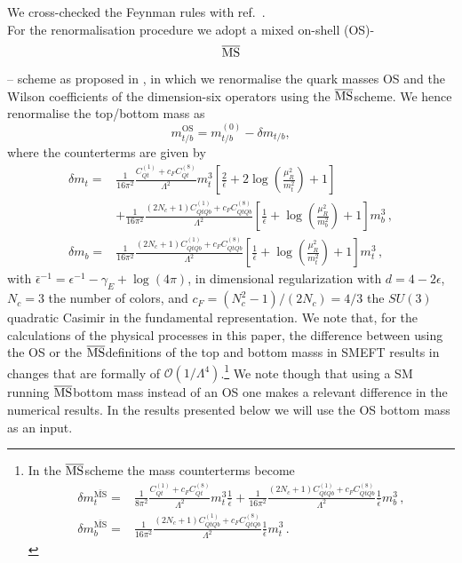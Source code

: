 We cross-checked the Feynman rules with ref.~\cite{Dedes:2017zog}.
\\
For the renormalisation procedure we adopt a mixed on-shell (OS)-$$\overline{\mathrm{MS}}$$ -- scheme as proposed in \cite{Dawson:2018pyl}, in which we renormalise 
the quark masses OS and the Wilson coefficients of the dimension-six operators using  the $\overline{\mathrm{MS}}$\;scheme. 
We hence renormalise the top/bottom mass as
\begin{equation}
	m_{t/b}^{\text{OS}}=m_{t/b}^{(0)}-\delta m_{t/b},
\end{equation}
%
where the counterterms are given by
\begin{align}
	\delta m_t =&\frac{1}{16 \pi^2} \frac{C_{Qt}^{(1)}+c_F C_{Qt}^{(8)}}{\Lambda^2}m_t^3\left[ \frac{2}{\bar{\epsilon}} +2 \log\left(\frac{\mu_R^2}{m_t^2}\right)+1\right] \\ &+ \frac{1}{16 \pi^2}  \frac{(2 N_c+1) C_{QtQb}^{(1)}+c_F C_{QtQb}^{(8)}}{\Lambda^2}  \left[ \frac{1}{\bar{\epsilon}} +  \log\left(\frac{\mu_R^2}{m_b^2}\right)+1 \right]  m_b^3\,, \nonumber \\
	\delta m_b=&\frac{1}{16 \pi^2} \frac{(2 N_c+1)C_{QtQb}^{(1)}+c_F C_{QtQb}^{(8)}}{\Lambda^2}\left[ \frac{1}{\bar{\epsilon}} +\log\left( \frac{\mu_R^2}{m_t^2}\right)+1\right] m_t^3\,,
\end{align}
with $\bar{\epsilon}^{-1} = \epsilon^{-1}- \gamma_E +\log(4 \pi)$, in dimensional regularization with $d=4-2\epsilon$, $N_c=3$ the number of colors, and $c_F=(N_c^2-1)/(2N_c)=4/3$ the $SU(3)$ quadratic Casimir in the fundamental representation. 
We note that, for the calculations of the physical processes in this paper, the difference between using the OS or the $\overline{\mathrm{MS}}$\;definitions of the top and bottom masss in SMEFT results in changes that are formally of $\mathcal{O}(1/\Lambda^4)$.\footnote{In the $\overline{\mathrm{MS}}$\;scheme the mass counterterms become
	\begin{align}
		\delta m_t^{\bar{\text{MS}}} =&\frac{1}{8 \pi^2} \frac{C_{Qt}^{(1)}+c_F C_{Qt}^{(8)}}{\Lambda^2}m_t^3\frac{1}{\bar{\epsilon}}+ \frac{1}{16 \pi^2}  \frac{(2 N_c+1) C_{QtQb}^{(1)}+c_F C_{QtQb}^{(8)}}{\Lambda^2}   \frac{1}{\bar{\epsilon}}  m_b^3\,,  \\
		\delta m_b^{\bar{\text{MS}}}=&\frac{1}{16 \pi^2} \frac{(2 N_c+1)C_{QtQb}^{(1)}+c_F C_{QtQb}^{(8)}}{\Lambda^2}\frac{1}{\bar{\epsilon}} m_t^3\,.
	\end{align}
}
We note though that using a SM running $\overline{\mathrm{MS}}$\;bottom mass instead of an OS one makes a relevant difference in the numerical results.
In the results presented below we will use the OS bottom mass as an input.

